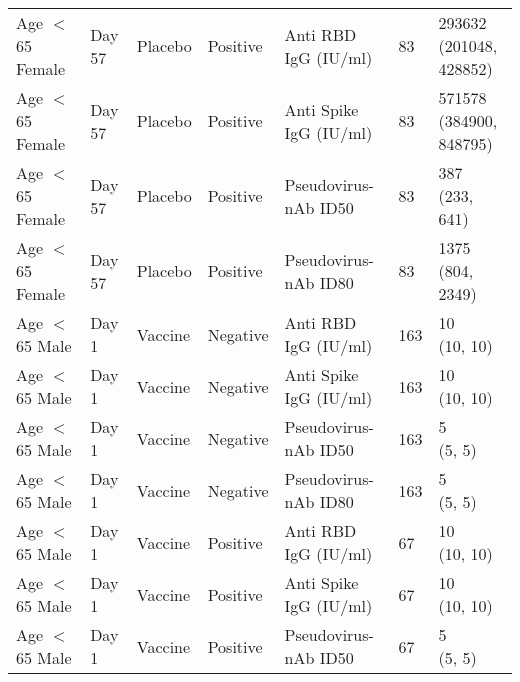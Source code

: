 \documentclass[]{book}
\theoremstyle{definition}
\theoremstyle{definition}
\theoremstyle{definition}
\newcommand{\1}{\mathbbm{1}}
\begin{document}
\begin{landscape}
\begin{ThreePartTable}
\begin{longtable}[t]{>{\raggedright\arraybackslash}p{7cm}llllll}
\hspace{1em}Age $<$ 65 Female & Day 57 & Placebo & Positive & Anti RBD IgG (IU/ml) & 83 & \makecell[l]{293632\\(201048, 428852)}\\
\hspace{1em}Age $<$ 65 Female & Day 57 & Placebo & Positive & Anti Spike IgG (IU/ml) & 83 & \makecell[l]{571578\\(384900, 848795)}\\
\hspace{1em}Age $<$ 65 Female & Day 57 & Placebo & Positive & Pseudovirus-nAb ID50 & 83 & \makecell[l]{387\\(233, 641)}\\
\hspace{1em}Age $<$ 65 Female & Day 57 & Placebo & Positive & Pseudovirus-nAb ID80 & 83 & \makecell[l]{1375\\(804, 2349)}\\
\hspace{1em}Age $<$ 65 Male & Day 1 & Vaccine & Negative & Anti RBD IgG (IU/ml) & 163 & \makecell[l]{10\\(10, 10)}\\
\hspace{1em}Age $<$ 65 Male & Day 1 & Vaccine & Negative & Anti Spike IgG (IU/ml) & 163 & \makecell[l]{10\\(10, 10)}\\
\hspace{1em}Age $<$ 65 Male & Day 1 & Vaccine & Negative & Pseudovirus-nAb ID50 & 163 & \makecell[l]{5\\(5, 5)}\\
\hspace{1em}Age $<$ 65 Male & Day 1 & Vaccine & Negative & Pseudovirus-nAb ID80 & 163 & \makecell[l]{5\\(5, 5)}\\
\hspace{1em}Age $<$ 65 Male & Day 1 & Vaccine & Positive & Anti RBD IgG (IU/ml) & 67 & \makecell[l]{10\\(10, 10)}\\
\hspace{1em}Age $<$ 65 Male & Day 1 & Vaccine & Positive & Anti Spike IgG (IU/ml) & 67 & \makecell[l]{10\\(10, 10)}\\
\hspace{1em}Age $<$ 65 Male & Day 1 & Vaccine & Positive & Pseudovirus-nAb ID50 & 67 & \makecell[l]{5\\(5, 5)}\\

\end{longtable}
\end{ThreePartTable}
\end{landscape}
\end{document}
